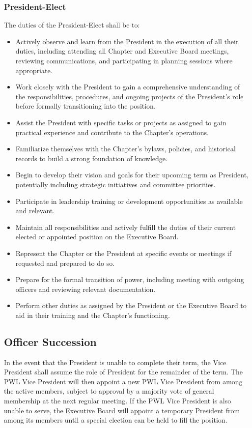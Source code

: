 \documentclass[10pt, oneside]{article}
\begin{document}
\subsubsection{President-Elect}
The duties of the President-Elect shall be to:
\begin{itemize}
    \item Actively observe and learn from the President in the execution of all their duties, including attending all Chapter and Executive Board meetings, reviewing communications, and participating in planning sessions where appropriate.
    \item Work closely with the President to gain a comprehensive understanding of the responsibilities, procedures, and ongoing projects of the President's role before formally transitioning into the position.
    \item Assist the President with specific tasks or projects as assigned to gain practical experience and contribute to the Chapter's operations.
    \item Familiarize themselves with the Chapter's bylaws, policies, and historical records to build a strong foundation of knowledge.
    \item Begin to develop their vision and goals for their upcoming term as President, potentially including strategic initiatives and committee priorities.
    \item Participate in leadership training or development opportunities as available and relevant.
    \item Maintain all responsibilities and actively fulfill the duties of their current elected or appointed position on the Executive Board.
    \item Represent the Chapter or the President at specific events or meetings if requested and prepared to do so.
    \item Prepare for the formal transition of power, including meeting with outgoing officers and reviewing relevant documentation.
    \item Perform other duties as assigned by the President or the Executive Board to aid in their training and the Chapter's functioning.
\end{itemize}

\subsection{Officer Succession}

In the event that the President is unable to complete their term, the Vice President shall assume the role of President for the remainder of the term. The PWL Vice President will then appoint a new PWL Vice President from among the active members, subject to approval by a majority vote of general membership at the next regular meeting. If the PWL Vice President is also unable to serve, the Executive Board will appoint a temporary President from among its members until a special election can be held to fill the position.
\end{document}
